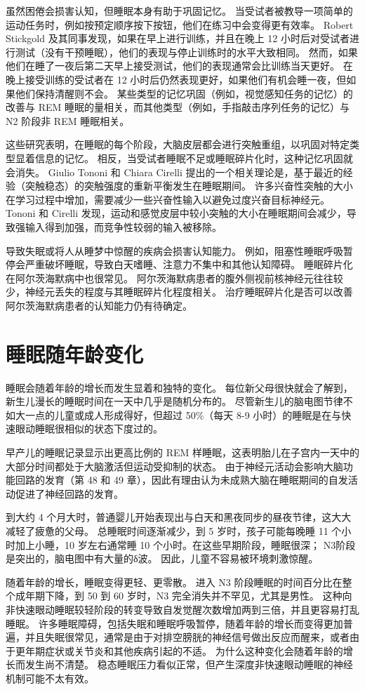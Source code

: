 虽然困倦会损害认知，但睡眠本身有助于巩固记忆。 当受试者被教导一项简单的运动任务时，例如按预定顺序按下按钮，他们在练习中会变得更有效率。 Robert Stickgold 及其同事发现，如果在早上进行训练，并且在晚上 12 小时后对受试者进行测试（没有干预睡眠），他们的表现与停止训练时的水平大致相同。 然而，如果他们在睡了一夜后第二天早上接受测试，他们的表现通常会比训练当天更好。 在晚上接受训练的受试者在 12 小时后仍然表现更好，如果他们有机会睡一夜，但如果他们保持清醒则不会。 某些类型的记忆巩固（例如，视觉感知任务的记忆）的改善与 REM 睡眠的量相关，而其他类型（例如，手指敲击序列任务的记忆）与 N2 阶段非 REM 睡眠相关。

这些研究表明，在睡眠的每个阶段，大脑皮层都会进行突触重组，以巩固对特定类型显着信息的记忆。 相反，当受试者睡眠不足或睡眠碎片化时，这种记忆巩固就会消失。 Giulio Tononi 和 Chiara Cirelli 提出的一个相关理论是，基于最近的经验（突触稳态）的突触强度的重新平衡发生在睡眠期间。 许多兴奋性突触的大小在学习过程中增加，需要减少一些兴奋性输入以避免过度兴奋目标神经元。 Tononi 和 Cirelli 发现，运动和感觉皮层中较小突触的大小在睡眠期间会减少，导致强输入得到加强，而竞争性较弱的输入被移除。

导致失眠或将人从睡梦中惊醒的疾病会损害认知能力。 例如，阻塞性睡眠呼吸暂停会严重破坏睡眠，导致白天嗜睡、注意力不集中和其他认知障碍。 睡眠碎片化在阿尔茨海默病中也很常见。 阿尔茨海默病患者的腹外侧视前核神经元往往较少，神经元丢失的程度与其睡眠碎片化程度相关。 治疗睡眠碎片化是否可以改善阿尔茨海默病患者的认知能力仍有待确定。


\section{睡眠随年龄变化}
睡眠会随着年龄的增长而发生显着和独特的变化。 每位新父母很快就会了解到，新生儿漫长的睡眠时间在一天中几乎是随机分布的。 尽管新生儿的脑电图节律不如大一点的儿童或成人形成得好，但超过 50\%（每天 8-9 小时）的睡眠是在与快速眼动睡眠很相似的状态下度过的。

早产儿的睡眠记录显示出更高比例的 REM 样睡眠，这表明胎儿在子宫内一天中的大部分时间都处于大脑激活但运动受抑制的状态。 由于神经元活动会影响大脑功能回路的发育（第 48 和 49 章），因此有理由认为未成熟大脑在睡眠期间的自发活动促进了神经回路的发育。

到大约 4 个月大时，普通婴儿开始表现出与白天和黑夜同步的昼夜节律，这大大减轻了疲惫的父母。 总睡眠时间逐渐减少，到 5 岁时，孩子可能每晚睡 11 个小时加上小睡，10 岁左右通常睡 10 个小时。在这些早期阶段，睡眠很深； N3阶段是突出的，脑电图中有大量的δ波。 因此，儿童不容易被环境刺激惊醒。

随着年龄的增长，睡眠变得更轻、更零散。 进入 N3 阶段睡眠的时间百分比在整个成年期下降，到 50 到 60 岁时，N3 完全消失并不罕见，尤其是男性。 这种向非快速眼动睡眠较轻阶段的转变导致自发觉醒次数增加两到三倍，并且更容易打乱睡眠。 许多睡眠障碍，包括失眠和睡眠呼吸暂停，随着年龄的增长而变得更加普遍，并且失眠很常见，通常是由于对排空膀胱的神经信号做出反应而醒来，或者由于更年期症状或关节炎和其他疾病引起的不适。 为什么这种变化会随着年龄的增长而发生尚不清楚。 稳态睡眠压力看似正常，但产生深度非快速眼动睡眠的神经机制可能不太有效。


